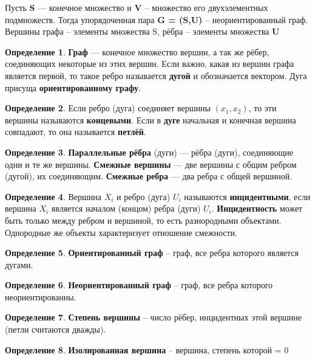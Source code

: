 \documentclass[12pt, a4paper, oneside]{article}
\theoremstyle{plain} %
\theoremstyle{definition}
\newtheorem*{definition}{Определение}  %
\newcommand{\indef}[1]{\textbf{ \color{dark_red} #1}}
\begin{document}
Пусть \textbf{S} --- конечное множество и \textbf{V} – множество его двухэлементных подмножеств.
Тогда упорядоченная пара \textbf{G = (S,U)} – неориентированный граф.
Вершины графа – элементы множества S, рёбра – элементы множества \textbf{U}

\begin{definition}
\textbf{Граф} --- конечное множество вершин, а так же рёбер, соединяющих некоторые из этих вершин.
Если важно, какая из вершин графа является первой, то такое ребро называется \textbf{дугой} и обозначается вектором. Дуга присуща \textbf{ориентированному графу}.
\end{definition}

\begin{definition}
Если ребро (дуга) соединяет вершины $(x_1,x_2)$, то эти вершины называются \indef{концевыми}.
Если в \textbf{дуге} начальная и конечная вершина совпадают, то она называется \indef{петлёй}.
\end{definition}

\begin{definition}
\indef{Параллельные рёбра} (дуги) --- рёбра (дуги), соединяющие одни и те же вершины.
\indef{Смежные вершины} --- две вершины с общим ребром (дугой), их соединяющим. \indef{Смежные ребра} --- два ребра с общей вершиной. 
\end{definition}

\begin{definition}
Вершина $X_i$ и ребро (дуга) $U_i$ называются \indef{инцидентными}, если вершина $X_i$  является началом (концом) ребра (дуги) $U_i$. \indef{Инцидентность} может быть только между ребром и вершиной, то есть разнородными объектами. Однородные же объекты характеризует отношение смежности.
\end{definition}

\begin{definition}
\indef{Ориентированный граф} – граф, все ребра которого является дугами.
\end{definition}

\begin{definition}
\indef{Неориентированный граф} – граф, все ребра которого неориентированны.
\end{definition}

\begin{definition}
\indef{Степень вершины} – число рёбер, инцидентных этой вершине (петли считаются дважды).
\end{definition}

\begin{definition}
\indef{Изолированная вершина} – вершина, степень которой = 0
\end{definition}
\end{document}
